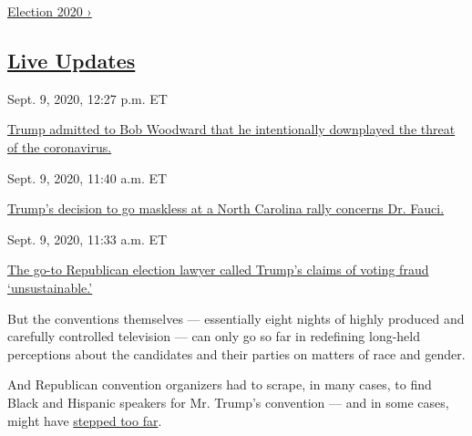 \href{https://www.nytimes3xbfgragh.onion/news-event/2020-election}{Election
2020 ›}

\hypertarget{live-updates}{%
\subsection{\texorpdfstring{\href{https://www.nytimes3xbfgragh.onion/live/2020/09/09/us/trump-vs-biden}{Live
Updates}}{Live Updates}}\label{live-updates}}

\href{https://www.nytimes3xbfgragh.onion/live/2020/09/09/us/trump-vs-biden\#trump-admitted-to-bob-woodward-that-he-intentionally-downplayed-the-threat-of-the-coronavirus}{}

Sept. 9, 2020, 12:27 p.m. ET

\href{https://www.nytimes3xbfgragh.onion/live/2020/09/09/us/trump-vs-biden\#trump-admitted-to-bob-woodward-that-he-intentionally-downplayed-the-threat-of-the-coronavirus}{Trump
admitted to Bob Woodward that he intentionally downplayed the threat of
the
coronavirus.}\href{https://www.nytimes3xbfgragh.onion/live/2020/09/09/us/trump-vs-biden\#trumps-decision-to-go-maskless-at-a-north-carolina-rally-concerns-dr-fauci}{}

Sept. 9, 2020, 11:40 a.m. ET

\href{https://www.nytimes3xbfgragh.onion/live/2020/09/09/us/trump-vs-biden\#trumps-decision-to-go-maskless-at-a-north-carolina-rally-concerns-dr-fauci}{Trump's
decision to go maskless at a North Carolina rally concerns Dr.
Fauci.}\href{https://www.nytimes3xbfgragh.onion/live/2020/09/09/us/trump-vs-biden\#the-go-to-republican-election-lawyer-called-trumps-claims-of-voting-fraud-unsustainable}{}

Sept. 9, 2020, 11:33 a.m. ET

\href{https://www.nytimes3xbfgragh.onion/live/2020/09/09/us/trump-vs-biden\#the-go-to-republican-election-lawyer-called-trumps-claims-of-voting-fraud-unsustainable}{The
go-to Republican election lawyer called Trump's claims of voting fraud
`unsustainable.'}

But the conventions themselves --- essentially eight nights of highly
produced and carefully controlled television --- can only go so far in
redefining long-held perceptions about the candidates and their parties
on matters of race and gender.

And Republican convention organizers had to scrape, in many cases, to
find Black and Hispanic speakers for Mr. Trump's convention --- and in
some cases, might have
\href{https://www.nytimes3xbfgragh.onion/2020/08/28/nyregion/nyc-tenants-rnc-video-trump.html?referringSource=articleShare}{stepped
too far}.

